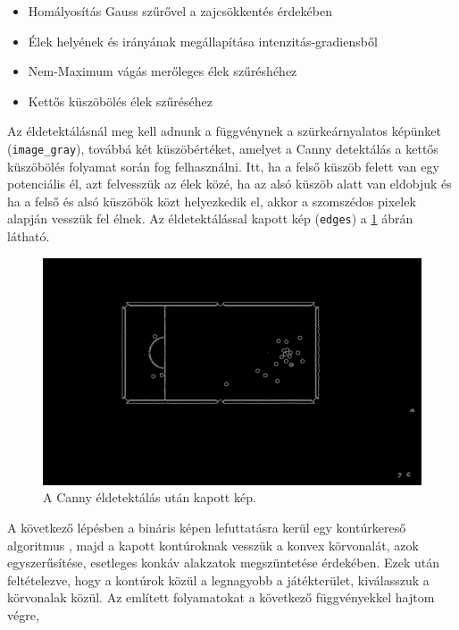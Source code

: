 \begin{itemize}
    \setlength\itemsep{-2pt}
    \item Homályosítás Gauss szűrővel \cite{shapiro2001} a zajcsökkentés érdekében
    \item Élek helyének és irányának megállapítása intenzitás-gradiensből
    \item Nem-Maximum vágás merőleges élek szűréshéhez
    \item Kettős küszöbölés élek szűréséhez
\end{itemize}

\par Az éldetektálásnál meg kell adnunk a függvénynek a szürkeárnyalatos képünket (\lstinline{image_gray}), továbbá két küszöbértéket, amelyet a Canny detektálás a kettős küszöbölés folyamat során fog felhasználni. Itt, ha a felső küszöb felett van egy potenciális él, azt felvesszük az élek közé, ha az alsó küszöb alatt van eldobjuk és ha a felső és alsó küszöbök közt helyezkedik el, akkor a szomszédos pixelek alapján vesszük fel élnek. Az éldetektálással kapott kép (\lstinline{edges}) a \ref{fig:bemeneti_kep_edge} ábrán látható.

\begin{figure}[!ht]
    \centering
    \includegraphics[width=150mm, keepaspectratio]{figures/input_screen_edge.png}
    \caption{A Canny éldetektálás után kapott kép.}
    \label{fig:bemeneti_kep_edge}
\end{figure}

\par A következő lépésben a bináris képen lefuttatásra kerül egy kontúrkereső algoritmus \cite{SUZUKI198532}, majd a kapott kontúroknak vesszük a konvex körvonalát, azok egyszerűsítése, esetleges konkáv alakzatok megszüntetése érdekében. Ezek után feltételezve, hogy a kontúrok közül a legnagyobb a játékterület, kiválasszuk a körvonalak közül.
\newline Az említett folyamatokat a következő függvényekkel hajtom végre,


